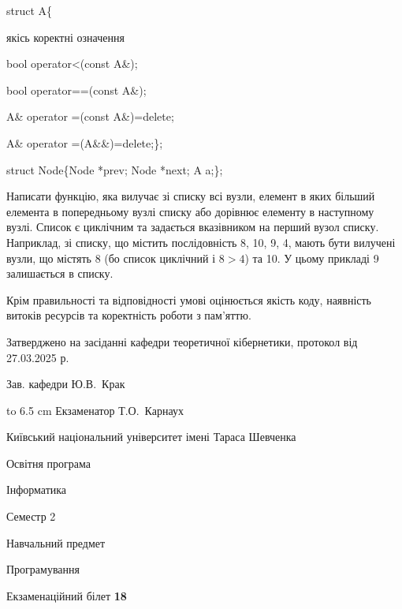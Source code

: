 \documentclass[12pt, ukrainian]{article}
\begin{document}
{struct A\{

\quad  якісь коректні означення 

\quad  bool operator<(const A\&); 

\quad  bool operator==(const A\&); 

\quad A\& operator =(const A\&)=delete; 

\quad  A\& operator =(A\&\&)=delete;\};

struct Node\{Node *prev; Node *next; A a;\};

Написати функцію, яка вилучає зі списку всі вузли, елемент в яких більший елемента в попередньому вузлі списку або дорівнює елементу в наступному вузлі. Список є циклічним та задається вказівником на перший вузол списку. Наприклад, зі списку, що містить послідовність 8, 10, 9, 4, мають бути вилучені вузли, що містять 8 (бо список циклічний і $8>4$) та 10. У цьому прикладі 9 залишається в списку.

Крім правильності та відповідності умові оцінюється якість коду, наявність витоків ресурсів та коректність роботи з пам'яттю. 

}
{\smallskip\smallskip \begin {scriptsize} Затверджено на засіданні кафедри теоретичної кібернетики, протокол   від   27.03.2025 р.\par\smallskip\smallskip\smallskip\smallskip
{\parbox {6.5 cm} {Зав. кафедри \dotfill Ю.В.~Крак}}\hspace {0.7cm} {\hbox to 6.5 cm { Екзаменатор \dotfill Т.О.~Карнаух}} \end{scriptsize}}
\newpage
{{\begin {scriptsize}\par
{ \center  Київський національний університет імені Тараса Шевченка \par}
{\parbox {5 cm}{Освітня програма \hfill}{\parbox {7 cm}{Інформатика\hfill}}\parbox {6 cm}{\hfill Семестр 2}}\par
{\parbox {5 cm} {Навчальний предмет \hfill}\parbox {7 cm}{Програмування \hfill}\parbox {6cm}{\hfill}\par}\vspace{-15pt} \end{scriptsize}}{\center Екзаменаційний білет \No \textbf { 18 }\par}}
\end{document}
